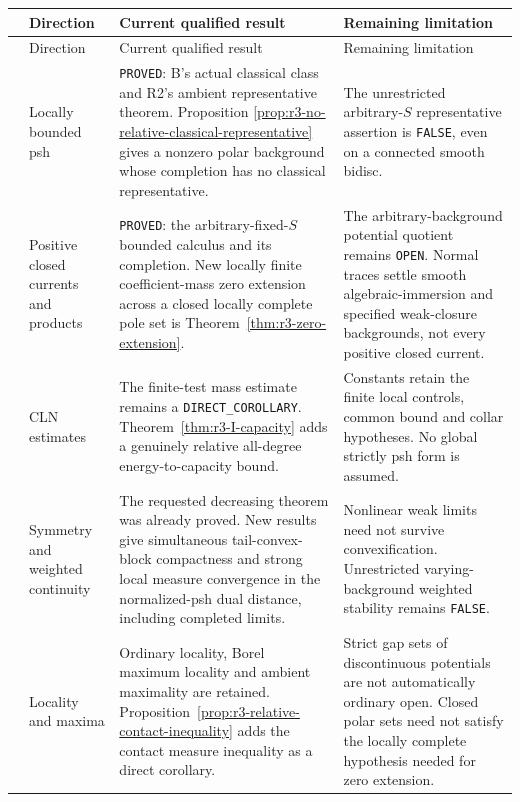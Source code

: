 \documentclass[11pt,a4paper]{article}
\numberwithin{equation}{section}
\theoremstyle{definition}
\theoremstyle{remark}
\begin{document}
\begin{longtable}{@{}>{\raggedright\arraybackslash}p{}>{\raggedright\arraybackslash}p{}>{\raggedright\arraybackslash}p{}>{\raggedright\arraybackslash}p{}@{}}
\hline
 & Direction & Current qualified result & Remaining limitation\\
\hline\endfirsthead
\hline
 & Direction & Current qualified result & Remaining limitation\\
\hline\endhead
1 & Locally bounded psh &
\texttt{PROVED}: B's actual classical class and R2's ambient
representative theorem. Proposition
\ref{prop:r3-no-relative-classical-representative} gives a nonzero
polar background whose completion has no classical representative. &
The unrestricted arbitrary-$S$ representative assertion is
\texttt{FALSE}, even on a connected smooth bidisc.\\[4pt]
2 & Positive closed currents and products &
\texttt{PROVED}: the arbitrary-fixed-$S$ bounded calculus and its
completion. New locally finite coefficient-mass zero extension across a closed locally
complete pole set is Theorem~\ref{thm:r3-zero-extension}. &
The arbitrary-background potential quotient remains \texttt{OPEN}.
Normal traces settle smooth algebraic-immersion and specified weak-closure
backgrounds, not every positive closed current.\\[4pt]
3 & CLN estimates &
The finite-test mass estimate remains a \texttt{DIRECT\_COROLLARY}.
Theorem~\ref{thm:r3-I-capacity} adds a genuinely relative
all-degree energy-to-capacity bound. &
Constants retain the finite local controls, common bound and collar
hypotheses. No global strictly psh form is assumed.\\[4pt]
4 & Symmetry and weighted continuity &
The requested decreasing theorem was already proved. New results
give simultaneous tail-convex-block compactness and strong local
measure convergence in the normalized-psh dual distance, including
completed limits. &
Nonlinear weak limits need not survive convexification. Unrestricted
varying-background weighted stability remains \texttt{FALSE}.\\[4pt]
5 & Locality and maxima &
Ordinary locality, Borel maximum locality and ambient maximality
are retained. Proposition~\ref{prop:r3-relative-contact-inequality}
adds the contact measure inequality as a direct corollary. &
Strict gap sets of discontinuous potentials are not automatically
ordinary open. Closed polar sets need not satisfy the locally
complete hypothesis needed for zero extension.\\[4pt]

\end{longtable}
\end{document}
